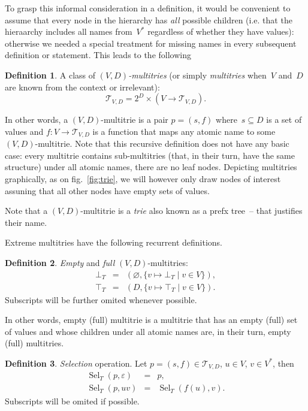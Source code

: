 \documentclass{article}
\theoremstyle{definition}
\newtheorem{Df}{Definition}
\newcommand{\setcharmt}{T}
\newcommand{\setsymbol}[3]{\mathcal{#1}_{#2,#3}}
\newcommand{\setmt}[2]{\setsymbol{\setcharmt}{#1}{#2}}
\newcommand{\select}{\operatorname{Sel}}
\begin{document}
To grasp this informal consideration in a definition, it would be convenient to
assume that every node in the hierarchy has \emph{all} possible children (i.e.
that the hieraarchy includes all names from~$V^\ast$ regardless of whether they
have values): otherwise we needed a special treatment for missing names in
every subsequent definition or statement. This leads to the following

\begin{Df}\label{df:mt}
A class of \emph{$(V,D)$-multitries} (or simply \emph{multitries} when~$V$
and~$D$ are known from the context or irrelevant):
\[
  \setmt{V}{D} = 2^D \times (V \to \setmt{V}{D}) .
\]
\end{Df}

In other words, a $(V,D)$-multitrie is a pair $p = (s, f)$ where~$s\subseteq D$
is a set of values and $f: V \to \setmt{V}{D}$ is a function that maps any
atomic name to some $(V,D)$-multitrie. Note that this recursive definition does
not have any basic case: every multitrie contains sub-multitries (that, in
their turn, have the same structure) under all atomic names, there are no leaf
nodes.
Depicting multitries graphically, as on fig.~\ref{fig:trie}, we will however
only draw nodes of interest assuning that all other nodes have empty sets of
values.

Note that a $(V,D)$-multitrie is a \emph{trie} also known as
a prefx tree~-- that justifies their name.

Extreme multitries have the following recurrent definitions.
\begin{Df}\label{df:mt-extreme}
\emph{Empty} and \emph{full} $(V,D)$-multitries:
\begin{eqnarray*}
  \bot_\setcharmt & = &
      ( \varnothing, \{ v \mapsto \bot_\setcharmt \mid v\in V \} ) , \\
  \top_\setcharmt & = &
      ( D,           \{ v \mapsto \top_\setcharmt \mid v\in V \} ) .
\end{eqnarray*}
Subscripts will be further omited whenever possible.
\end{Df}
In other words, empty (full) multitrie is a multitrie that has an empty
(full) set of values and whose children under all atomic names are, in their
turn, empty (full) multitries.

\begin{Df}\label{df:mt-select}
\emph{Selection} operation. Let $p=(s,f) \in \setmt{V}{D}$, $u\in V$,
$v\in V^\ast$, then
\begin{eqnarray*}
  \select_\setcharmt(p, \varepsilon) & = & p , \\
  \select_\setcharmt(p, u v) & = & \select_\setcharmt(f(u), v) .
\end{eqnarray*}
Subscripts will be omited if possible.
\end{Df}
\end{document}

